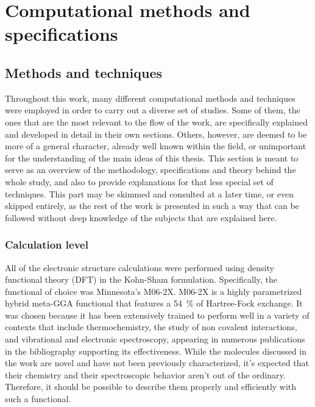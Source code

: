 \chapter{Computational methods and specifications}

\section{Methods and techniques}

Throughout this work, many different computational methods and techniques were employed in order to carry out a diverse set of studies.
Some of them, the ones that are the most relevant to the flow of the work, are specifically explained and developed in detail in their own sections.
Others, however, are deemed to be more of a general character, already well known within the field, or unimportant for the understanding of the main ideas of this thesis.
This section is meant to serve as an overview of the methodology, specifications and theory behind the whole study, and also to provide explanations for that less special set of techniques.
This part may be skimmed and consulted at a later time, or even skipped entirely, as the rest of the work is presented in such a way that can be followed without deep knowledge of the subjects that are explained here.

\subsection{Calculation level}
All of the electronic structure calculations were performed using density functional theory (DFT) in the Kohn-Sham formulation.
Specifically, the functional of choice was Minnesota's M06-2X.
M06-2X is a highly parametrized hybrid meta-GGA functional that features a \SI{54}{\percent} of Hartree-Fock exchange.
It was chosen because it has been extensively trained to perform well in a variety of contexts that include thermochemistry, the study of non covalent interactions, and vibrational and electronic spectroscopy, appearing in numerous publications in the bibliography supporting its effectiveness.\cite{head16,vidalvidal17,vidalvidal17-2,vidalvidal18,sert14,eizig15,coccia17}
While the molecules discussed in the work are novel and have not been previously characterized, it's expected that their chemistry and their spectroscopic behavior aren't out of the ordinary.
Therefore, it should be possible to describe them properly and efficiently with such a functional.

